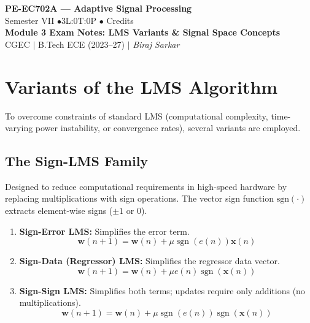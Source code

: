 \documentclass[12pt,a4paper]{article}
\begin{document}

\begin{center}
  {\LARGE\bfseries\color{myred} PE-EC702A --- Adaptive Signal Processing}\\[5pt]
  {\normalsize\color{mydark} Semester VII \quad$\bullet$\quad 3L:0T:0P \quad$\bullet$ Credits}\\[3pt]
  {\normalsize\color{myteal}\textbf{Module 3 Exam Notes: LMS Variants \& Signal Space Concepts}}\\[3pt]
  {\small\color{mydark} CGEC \;$|$\; B.Tech ECE (2023--27) \;$|$\; \textit{Biraj Sarkar}}
\end{center}
\vspace{2pt}
\noindent{\color{myred}\rule{\linewidth}{1.5pt}}
\vspace{2pt}

\hypersetup{linkcolor=mydark}
\tableofcontents
\hypersetup{linkcolor=myteal}
\newpage

\section{Variants of the LMS Algorithm}

To overcome constraints of standard LMS (computational complexity, time-varying power instability, or convergence rates), several variants are employed.

\subsection{The Sign-LMS Family}
Designed to reduce computational requirements in high-speed hardware by replacing multiplications with sign operations. The vector sign function $\text{sgn}(\cdot)$ extracts element-wise signs ($\pm 1$ or $0$).
\begin{enumerate}[label=\textbf{\arabic*.}, leftmargin=*, itemsep=3pt]
  \item \textbf{Sign-Error LMS:} Simplifies the error term.
  \begin{equation}
    \mathbf{w}(n+1) = \mathbf{w}(n) + \mu \operatorname{sgn}(e(n)) \mathbf{x}(n)
  \end{equation}
  \item \textbf{Sign-Data (Regressor) LMS:} Simplifies the regressor data vector.
  \begin{equation}
    \mathbf{w}(n+1) = \mathbf{w}(n) + \mu e(n) \operatorname{sgn}(\mathbf{x}(n))
  \end{equation}
  \item \textbf{Sign-Sign LMS:} Simplifies both terms; updates require only additions (no multiplications).
  \begin{equation}
    \mathbf{w}(n+1) = \mathbf{w}(n) + \mu \operatorname{sgn}(e(n)) \operatorname{sgn}(\mathbf{x}(n))
  \end{equation}
\end{enumerate}
\end{document}
